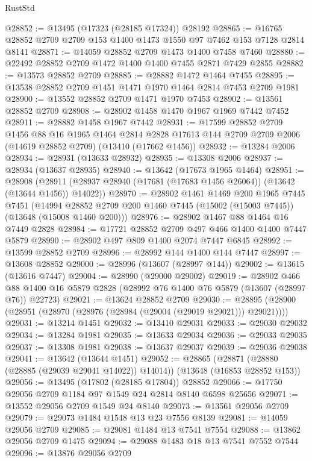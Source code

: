 \begin{lexlean}{RustStd}
\begin{coremodule}
@28852 := @13495 (@17323 (@28185 @17324)) @28192
@28865 := @16765 @28852 @2709 @2709 @153 @1400 @1473 @1550 @97 @7462 @153 @7128 @2814 @8141
@28871 := @14059 @28852 @2709 @1473 @1400 @7458 @7460
@28880 := @22492 @28852 @2709 @1472 @1400 @1400 @7455 @2871 @7429 @2855
@28882 := @13573 @28852 @2709
@28885 := @28882 @1472 @1464 @7455
@28895 := @13538 @28852 @2709 @1451 @1471 @1970 @1464 @2814 @7453 @2709 @1981
@28900 := @13552 @28852 @2709 @1471 @1970 @7453
@28902 := @13561 @28852 @2709
@28908 := @28902 @1458 @1470 @1967 @1969 @7442 @7452
@28911 := @28882 @1458 @1967 @7442
@28931 := @17599
    @28852
    @2709
    @1456
    @88
    @16
    @1965
    @1464
    @2814
    @2828
    @17613
    @144
    @2709
    @2709
    @2006
    (@14619 @28852 @2709)
    (@13410 (@17662 @1456))
@28932 := @13284 @2006
@28934 := @28931 (@13633 @28932)
@28935 := @13308 @2006
@28937 := @28934 (@13637 @28935)
@28940 := @13642 (@17673 @1965 @1464)
@28951 := @28908
    (@28911 (@28937 @28940 (@17681 (@17683 @1456 @26064)) (@13642 (@13644 @1456)) @14022))
@28970 := @28902
    @1461
    @1469
    @200
    @1965
    @7445
    @7451
    (@14994 @28852 @2709 @200 @1460 @7445 (@15002 (@15003 @7445)) (@13648 (@15008 @1460 @200)))
@28976 := @28902 @1467 @88 @1464 @16 @7449 @2828
@28984 := @17721 @28852 @2709 @497 @466 @1400 @1400 @7447 @5879
@28990 := @28902 @497 @809 @1400 @2074 @7447 @6845
@28992 := @13599 @28852 @2709
@28996 := @28992 @144 @1400 @144 @7447
@28997 := @13608 @28852
@29000 := @28996 (@13607 (@28997 @144))
@29002 := @13615 (@13616 @7447)
@29004 := @28990 (@29000 @29002)
@29019 := @28902
    @466
    @88
    @1400
    @16
    @5879
    @2828
    (@28992 @76 @1400 @76 @5879 (@13607 (@28997 @76)) @22723)
@29021 := @13624 @28852 @2709
@29030 := @28895 (@28900 (@28951 (@28970 (@28976 (@28984 (@29004 (@29019 @29021))) @29021))))
@29031 := @13214 @1451
@29032 := @13410 @29031
@29033 := @29030 @29032
@29034 := @13284 @1981
@29035 := @13633 @29034
@29036 := @29033 @29035
@29037 := @13308 @1981
@29038 := @13637 @29037
@29039 := @29036 @29038
@29041 := @13642 (@13644 @1451)
@29052 := @28865
    (@28871 (@28880 (@28885 (@29039 @29041 @14022)) @14014))
    (@13648 (@16853 @28852 @153))
@29056 := @13495 (@17802 (@28185 @17804)) @28852
@29066 := @17750 @29056 @2709 @1184 @97 @1549 @24 @2814 @8140 @6598 @25656
@29071 := @13552 @29056 @2709 @1549 @24 @8140
@29073 := @13561 @29056 @2709
@29079 := @29073 @1484 @1548 @13 @23 @7556 @8139
@29081 := @14059 @29056 @2709
@29085 := @29081 @1484 @13 @7541 @7554
@29088 := @13862 @29056 @2709 @1475
@29094 := @29088 @1483 @18 @13 @7541 @7552 @7544
@29096 := @13876 @29056 @2709

\end{coremodule}
\end{lexlean}
